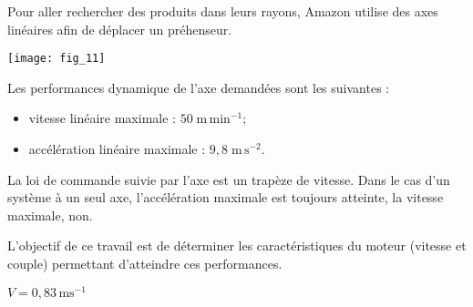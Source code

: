 \begin{multicols}{2}
%
%
%
%




Pour aller rechercher des produits dans leurs rayons, Amazon utilise des axes linéaires afin de déplacer un préhenseur.
\begin{center}
\texttt{[image: fig\_11]}
\end{center}

Les performances dynamique de l'axe demandées sont les suivantes : 
\begin{itemize}
\item vitesse linéaire maximale : $50 \; \text{m}\,\text{min}^{-1}$;
\item accélération linéaire maximale : $9,8 \; \text{m}\, \text{s}^{-2}$.
\end{itemize}

La loi de commande suivie par l'axe est un trapèze de vitesse. Dans le cas d'un système à un seul axe, l'accélération maximale est toujours atteinte, la vitesse maximale, non.

\begin{obj}
L'objectif de ce travail est de déterminer les caractéristiques du moteur (vitesse et couple) permettant d'atteindre ces performances.
\end{obj}

\ifprof
\begin{corrige}
$V = 0,83 \, \text{ms}^{-1}$
\end{corrige}
\else
\fi


\end{multicols}
